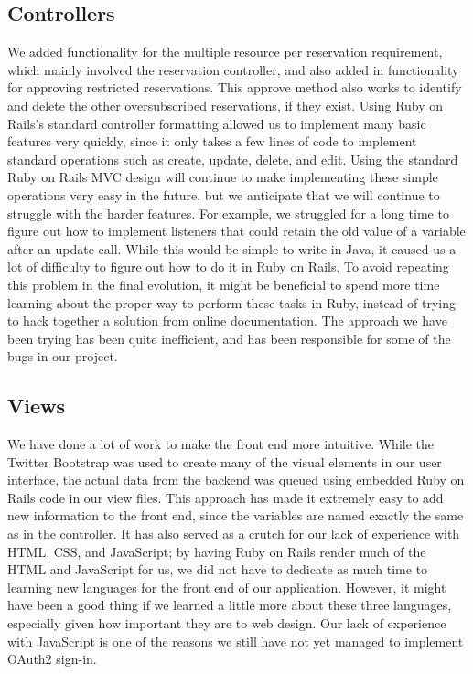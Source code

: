 \documentclass{article}
\begin{document}
\subsection{Controllers}
We added functionality for the multiple resource per reservation requirement, which mainly involved the reservation controller, and also added in functionality for approving restricted reservations. This approve method also works to identify and delete the other oversubscribed reservations, if they exist.  Using Ruby on Rails's standard controller formatting allowed us to implement many basic features very quickly, since it only takes a few lines of code to implement standard operations such as create, update, delete, and edit.  Using the standard Ruby on Rails MVC design will continue to make implementing these simple operations very easy in the future, but we anticipate that we will continue to struggle with the harder features.  For example, we struggled for a long time to figure out how to implement listeners that could retain the old value of a variable after an update call.  While this would be simple to write in Java, it caused us a lot of difficulty to figure out how to do it in Ruby on Rails.  To avoid repeating this problem in the final evolution, it might be beneficial to spend more time learning about the proper way to perform these tasks in Ruby, instead of trying to hack together a solution from online documentation.  The approach we have been trying has been quite inefficient, and has been responsible for some of the bugs in our project.

\subsection{Views}

We have done a lot of work to make the front end more intuitive.  While the Twitter Bootstrap was used to create many of the visual elements in our user interface, the actual data from the backend was queued using embedded Ruby on Rails code in our view files.  This approach has made it extremely easy to add new information to the front end, since the variables are named exactly the same as in the controller.  It has also served as a crutch for our lack of experience with HTML, CSS, and JavaScript; by having Ruby on Rails render much of the HTML and JavaScript for us, we did not have to dedicate as much time to learning new languages for the front end of our application.  However, it might have been a good thing if we learned a little more about these three languages, especially given how important they are to web design.  Our lack of experience with JavaScript is one of the reasons we still have not yet managed to implement OAuth2 sign-in.\par
\end{document}
